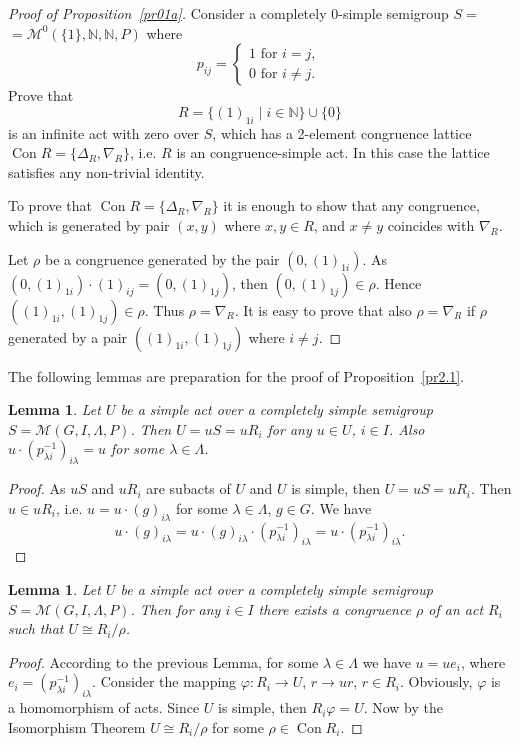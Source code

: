 \documentclass{birkau}
\numberwithin{equation}{section}
\theoremstyle{plain}
\newtheorem{lemma}[theorem]{Lemma}
\theoremstyle{definition}
\DeclareMathOperator{\Con}{Con}
\begin{document}
	\begin{proof}[Proof of Proposition~\ref{pr01a}]
	    Consider a completely 0-simple semigroup $S = $ \newline $ = \mathcal{M}^0(\{1\},\mathbb{N},\mathbb{N},P)$ where
	    $$ p_{ij} =
			\begin{cases}
				1 \text{ for } i = j,\\
				0 \text{ for } i \neq j.
			\end{cases}
		$$
		Prove that $$ R = \{ (1)_{1i} \mid i \in \mathbb{N} \} \cup \{0\} $$ is an infinite act with zero over $S$, which has a 2-element congruence lattice  $\Con R = \{ \Delta_R, \nabla_R\}$, i.e. $R$ is an congruence-simple act. In this case the lattice satisfies any non-trivial identity.
		
		To prove that $\Con R = \{ \Delta_R, \nabla_R \}$ it is enough to show that any congruence, which is generated by pair $(x,y)$ where $x,y \in R$, and $x \neq y$ coincides with $\nabla_R$.
		
		Let $\rho$ be a congruence generated by the pair $(0,(1)_{1i})$. As $(0,(1)_{1i}) \cdot (1)_{ij} = (0,(1)_{1j})$, then $(0,(1)_{1j}) \in \rho$. Hence $((1)_{1i},(1)_{1j}) \in \rho$. Thus $\rho = \nabla_R$. It is easy to prove that also $\rho = \nabla_R$ if $\rho$ generated by a pair $((1)_{1i},(1)_{1j})$ where $i \neq j$.
	\end{proof}
	
	The following lemmas are preparation for the proof of Proposition~\ref{pr2.1}.
	
	\begin{lemma}   \label{l2.1}
	    Let $U$ be a simple act over a completely simple semigroup $S = \mathcal{M}(G,I,\Lambda,P)$. Then $U = uS = u R_i$ for any $u \in U$, $i \in I$. Also $u \cdot
	    {(p_{\lambda i}^{-1})}_{i \lambda} = u$ for some $\lambda \in \Lambda$.
	\end{lemma}
	\begin{proof}
	    As $uS$ and $uR_i$ are subacts of $U$ and $U$ is simple, then $U = uS = u R_i$. Then $u \in u R_i$, i.e. $u = u \cdot (g)_{i \lambda}$ for some $\lambda \in \Lambda$, $g \in G$. We have $$ u \cdot {(g)}_{i \lambda} = u \cdot (g)_{i \lambda} \cdot {(p_{\lambda i}^{-1})}_{i \lambda} = u \cdot {(p_{\lambda i}^{-1})}_{i \lambda}.$$
	\end{proof}
	
	\begin{lemma} \label{l2.2}
	    Let $U$ be a simple act over a completely simple semigroup $S = \mathcal{M}(G,I,\Lambda,P)$. Then for any $i \in I$ there exists a congruence $\rho$ of an act $R_i$ such that $U \cong {R_i}/{\rho}$.
	\end{lemma}
	\begin{proof}
	    According to the previous Lemma, for some $\lambda \in \Lambda$ we have $u = u e_i$, where $e_i = (p_{\lambda i}^{-1})_{i \lambda}$. Consider the mapping $\varphi: R_i \rightarrow U$, $r \rightarrow ur$, $r \in R_i$. Obviously, $\varphi$ is a homomorphism of acts. Since $U$ is simple, then $R_i \varphi = U$. Now by the Isomorphism Theorem $U \cong {R_i}/{\rho}$ for some $\rho \in \Con R_i$.
	\end{proof}
	
\end{document}
